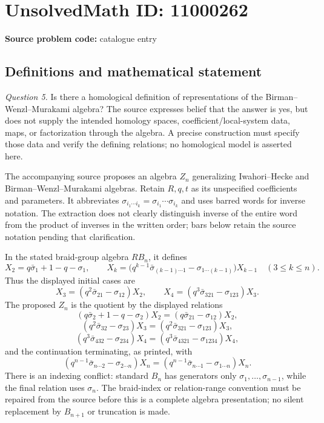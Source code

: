 \documentclass[11pt]{article}
\begin{document}
\section*{UnsolvedMath ID: 11000262}
\textbf{Source problem code:} catalogue entry
\subsection{Definitions and mathematical statement}
\emph{Question 5.} Is there a homological definition of representations of the Birman--Wenzl--Murakami algebra? The source expresses belief that the answer is yes, but does not supply the intended homology spaces, coefficient/local-system data, maps, or factorization through the algebra. A precise construction must specify those data and verify the defining relations; no homological model is asserted here.

The accompanying source proposes an algebra \(Z_n\) generalizing Iwahori--Hecke and Birman--Wenzl--Murakami algebras. Retain \(R,q,t\) as its unspecified coefficients and parameters. It abbreviates \(\sigma_{i_1\cdots i_k}=\sigma_{i_1}\cdots\sigma_{i_k}\) and uses barred words for inverse notation. The extraction does not clearly distinguish inverse of the entire word from the product of inverses in the written order; bars below retain the source notation pending that clarification.

In the stated braid-group algebra \(R B_n\), it defines
\[
 X_2=q\bar\sigma_1+1-q-\sigma_1,
 \qquad
 X_k=\bigl(q^{k-1}\bar\sigma_{(k-1)\cdots1}
              -\sigma_{1\cdots(k-1)}\bigr)X_{k-1}\quad(3\leq k\leq n).
\]
Thus the displayed initial cases are
\[
 X_3=(q^2\bar\sigma_{21}-\sigma_{12})X_2,
 \qquad X_4=(q^3\bar\sigma_{321}-\sigma_{123})X_3.
\]
The proposed \(Z_n\) is the quotient by the displayed relations
\[
 (q\bar\sigma_2+1-q-\sigma_2)X_2
       =(q\bar\sigma_{21}-\sigma_{12})X_2,
\]
\[
 (q^2\bar\sigma_{32}-\sigma_{23})X_3
       =(q^2\bar\sigma_{321}-\sigma_{123})X_3,
\]
\[
 (q^3\bar\sigma_{432}-\sigma_{234})X_4
       =(q^3\bar\sigma_{4321}-\sigma_{1234})X_4,
\]
and the continuation terminating, as printed, with
\[
 (q^{n-1}\bar\sigma_{n\cdots2}-\sigma_{2\cdots n})X_n
       =(q^{n-1}\bar\sigma_{n\cdots1}-\sigma_{1\cdots n})X_n.
\]
There is an indexing conflict: standard \(B_n\) has generators only \(\sigma_1,\ldots,\sigma_{n-1}\), while the final relation uses \(\sigma_n\). The braid-index or relation-range convention must be repaired from the source before this is a complete algebra presentation; no silent replacement by \(B_{n+1}\) or truncation is made.
\end{document}
